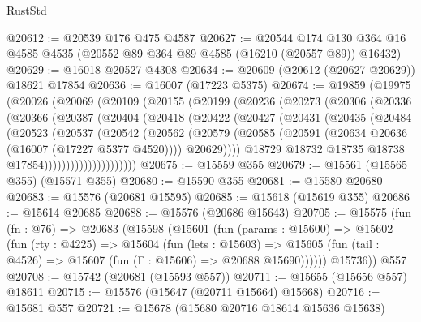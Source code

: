 \begin{lexlean}{RustStd}
\begin{coremodule}
@20612 := @20539 @176 @475 @4587
@20627 := @20544
    @174
    @130
    @364
    @16
    @4585
    @4535
    (@20552 @89 @364 @89 @4585 (@16210 (@20557 @89)) @16432)
@20629 := @16018 @20527 @4308
@20634 := @20609 (@20612 (@20627 @20629)) @18621 @17854
@20636 := @16007 (@17223 @5375)
@20674 := @19859
    (@19975
      (@20026
        (@20069
          (@20109
            (@20155
              (@20199
                (@20236
                  (@20273
                    (@20306
                      (@20336
                        (@20366
                          (@20387
                            (@20404
                              (@20418
                                (@20422
                                  (@20427
                                    (@20431
                                      (@20435
                                        (@20484
                                          (@20523
                                            (@20537
                                              (@20542
                                                (@20562
                                                  (@20579
                                                    (@20585
                                                      (@20591
                                                        (@20634
                                                          @20636
                                                          (@16007 (@17227 @5377 @4520))))
                                                      @20629))))
                                              @18729
                                              @18732
                                              @18735
                                              @18738
                                              @17854)))))))))))))))))))))
@20675 := @15559 @355
@20679 := @15561 (@15565 @355) (@15571 @355)
@20680 := @15590 @355
@20681 := @15580 @20680
@20683 := @15576 (@20681 @15595)
@20685 := @15618 (@15619 @355)
@20686 := @15614 @20685
@20688 := @15576 (@20686 @15643)
@20705 := @15575
    (fun (fn : @76) =>
    @20683
      (@15598
        (@15601
          (fun (params : @15600) =>
          @15602
            (fun (rty : @4225) =>
            @15604
              (fun (lets : @15603) =>
              @15605 (fun (tail : @4526) => @15607 (fun (Γ : @15606) => @20688 @15690))))))
        @15736))
    @557
@20708 := @15742 (@20681 (@15593 @557))
@20711 := @15655 (@15656 @557) @18611
@20715 := @15576 (@15647 (@20711 @15664) @15668)
@20716 := @15681 @557
@20721 := @15678 (@15680 @20716 @18614 @15636 @15638)

\end{coremodule}
\end{lexlean}
